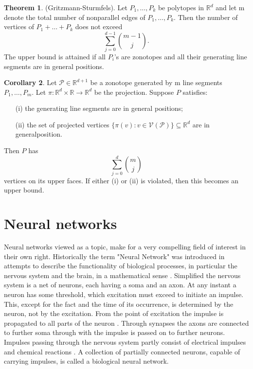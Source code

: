 \documentclass{article}
\theoremstyle{definition}
\newtheorem{theorem}{Theorem}[section]
\newtheorem{corollary}[theorem]{Corollary}
\begin{document}
\begin{theorem}
(Gritzmann-Sturmfels). Let $P_1, \dots , P_k$ be polytopes in $\mathbb{R}^{d}$ and let m denote the total number of nonparallel edges of $P_1, \dots , P_k$. Then the number of vertices of $P_1 + \dots + P_k$ does not exceed
$$\sum_{j=0}^{d-1} \binom{m-1}{j}.$$
The upper bound is attained if all $P_i$'s are zonotopes and all their generating line segments are in general positions. \cite{gritzmann1993minkowski}
\end{theorem}

\begin{corollary}
Let $\mathcal{P} \in \mathbb{R}^{d+1}$ be a zonotope generated by m line segments $P_1 , \dots , P_m$. Let $\pi : \mathbb{R}^{d} \times \mathbb{R} \to \mathbb{R}^{d}$ be the projection. Suppose $P$ satisfies:
\begin{itemize}
\item[(i)]
the generating line segments are in general positions;
\item[(ii)]
the set of projected vertices $\{ \pi(v) : v \in \mathcal{V}(\mathcal{P}) \} \subseteq \mathbb{R}^{d}$ are in generalposition.
\end{itemize}
Then $P$ has
$$ \sum_{j=0}^{d} \binom{m}{j} $$
vertices on its upper faces. If either (i) or (ii) is violated, then this becomes an upper bound. \cite[p.~4]{zhang2018tropical}
\end{corollary}

\newpage

\section{Neural networks}

Neural networks viewed as a topic, make for a very compelling field of interest in their own right. Historically the term "Neural Network" was introduced in attempts to describe the functionality of biological processes, in particular the nervous system and the brain, in a mathematical sense \cite{mcculloch1943logical, widrow1960adaptive, rumelhart1986learning}. Simplified the nervous system is a net of neurons, each having a soma and an axon. At any instant a neuron has some threshold, which excitation must exceed to initiate an impulse. This, except for the fact and the time of its occurrence, is determined by the neuron, not by the excitation. From the point of excitation the impulse is propagated to all parts of the neuron \cite{mcculloch1943logical}. Through synapses the axons are connected to further soma through with the impulse is passed on to further neurons. Impulses passing through the nervous system partly consist of electrical impulses and chemical reactions \cite{palay1956synapses}. A collection of partially connected neurons, capable of carrying impulses, is called a biological neural network.
\end{document}
